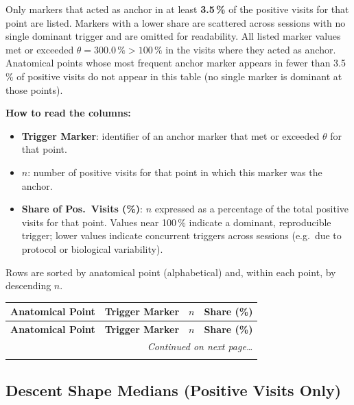 \documentclass[a4paper,11pt]{article}
\begin{document}
\medskip
Only markers that acted as anchor in at least \textbf{3.5\,\%}
of the positive visits for that point are listed.
Markers with a lower share are scattered across sessions with no single dominant trigger
and are omitted for readability.
All listed marker values met or exceeded $\theta = 300.0\,\% > 100\,\%$ in the
visits where they acted as anchor.
Anatomical points whose most frequent anchor marker appears in fewer than
3.5\,\% of positive visits do not appear in this table (no single
marker is dominant at those points).

\medskip
\noindent\textbf{How to read the columns:}
\begin{itemize}
  \item \textbf{Trigger Marker}: identifier of an anchor marker that met or exceeded $\theta$
        for that point.
  \item \textbf{$n$}: number of positive visits for that point in which this marker was
        the anchor.
  \item \textbf{Share of Pos.\ Visits (\%)}: $n$ expressed as a percentage of the total
        positive visits for that point.
        Values near 100\,\% indicate a dominant, reproducible trigger;
        lower values indicate concurrent triggers across sessions (e.g.\ due to
        protocol or biological variability).
\end{itemize}

\medskip
\noindent Rows are sorted by anatomical point (alphabetical) and, within each point, by
descending $n$.

\begin{footnotesize}
\begin{longtable}{p{3.5cm}p{7.5cm}rr}
\toprule
\textbf{Anatomical Point} &
\textbf{Trigger Marker} &
\textbf{$n$} &
\textbf{Share (\%)} \\
\midrule
\endfirsthead
\toprule
\textbf{Anatomical Point} &
\textbf{Trigger Marker} &
\textbf{$n$} &
\textbf{Share (\%)} \\
\midrule
\endhead
\midrule
\multicolumn{4}{r}{\footnotesize\emph{Continued on next page\ldots}} \\
\endfoot
\bottomrule
\endlastfoot

\end{longtable}
\end{footnotesize}

\subsection{Descent Shape Medians (Positive Visits Only)}
\end{document}
